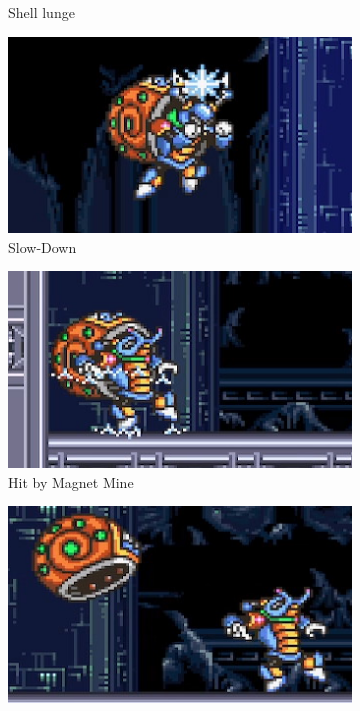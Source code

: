 \begin{figure}
\begin{subfigure}{0.45\linewidth}
		\caption{Shell lunge}
	\end{subfigure}
	\begin{subfigure}{0.45\linewidth}
		\centering
		\includegraphics[width=\linewidth]{figures/X2/Crystal_snail/Crystal_DM.png}
		\caption{Slow-Down}
	\end{subfigure}
	\begin{subfigure}{0.45\linewidth}
		\centering
		\includegraphics[width=\linewidth]{figures/X2/Crystal_snail/Crystal_weakness.png}
		\caption{Hit by Magnet Mine}
	\end{subfigure}
	\begin{subfigure}{0.45\linewidth}
		\centering
		\includegraphics[width=\linewidth]{figures/X2/Crystal_snail/Crystal_weakness_2.png}

\end{subfigure}
\end{figure}
